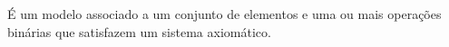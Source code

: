 \documentclass[../../main]{subfiles}
\begin{document}
    \begin{defi}\label{defi:estrutura-algebrica}
        É um modelo associado a um conjunto de elementos e uma ou mais operações binárias que satisfazem um sistema axiomático.
    \end{defi}
\end{document}
